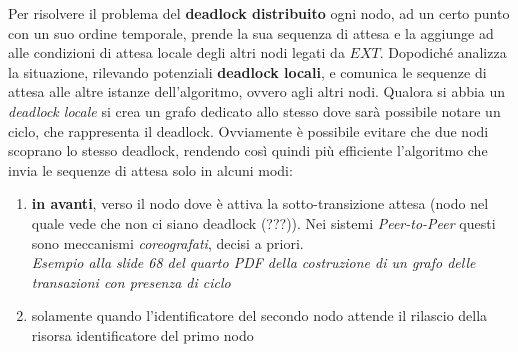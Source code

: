 \documentclass[a4paper,12pt, oneside]{book}
\begin{document}
Per risolvere il problema del \textbf{deadlock distribuito} ogni nodo, ad un
certo punto con un suo ordine temporale, prende la sua sequenza di attesa e la
aggiunge ad alle condizioni di attesa locale degli altri nodi legati da
$EXT$. Dopodiché analizza la situazione, rilevando potenziali \textbf{deadlock
  locali}, e comunica le sequenze di attesa alle altre istanze dell'algoritmo,
ovvero agli altri nodi. Qualora si abbia un \textit{deadlock locale} si crea un
grafo dedicato allo stesso dove sarà possibile notare un ciclo, che rappresenta
il deadlock. Ovviamente è possibile evitare che due nodi scoprano
lo stesso deadlock, rendendo così quindi più efficiente l'algoritmo che invia le
sequenze di attesa solo in alcuni modi:
\begin{enumerate}
  \item \textbf{in avanti}, verso il nodo dove è attiva la sotto-transizione
  attesa (nodo nel quale vede che non ci siano deadlock (???)). Nei sistemi
  \textit{Peer-to-Peer} questi sono meccanismi \textit{coreografati}, decisi a
  priori.\\
  \textit{Esempio alla slide 68 del quarto PDF della costruzione di un grafo
    delle transazioni con presenza di ciclo}
  \item solamente quando l'identificatore del secondo nodo attende il
  rilascio della risorsa identificatore del primo nodo
\end{enumerate}
\end{document}
